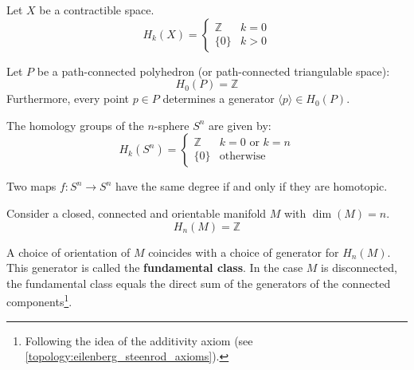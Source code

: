 	\begin{example}
		Let $X$ be a contractible space.
		\begin{equation}
			H_k(X) = \begin{cases}
				\mathbb{Z}&k=0\\
				\{0\}&k>0
			\end{cases}
		\end{equation}
	\end{example}
	\begin{example}
		Let $P$ be a path-connected polyhedron (or path-connected triangulable space):
		\begin{equation}
			H_0(P) = \mathbb{Z}
		\end{equation}
		Furthermore, every point $p\in P$ determines a generator $\langle p \rangle\in H_0(P)$.
	\end{example}
	\begin{example}
		The homology groups of the $n$-sphere $S^n$ are given by:
		\begin{equation}
			H_k(S^n)=\begin{cases}
				\mathbb{Z}&k=0\text{ or }k=n\\
				\{0\}&\text{otherwise}
			\end{cases}
		\end{equation}
	\end{example}
	\begin{property}
		Two maps $f:S^n\rightarrow S^n$ have the same degree if and only if they are homotopic.
	\end{property}
	
	\begin{example}
		Consider a closed, connected and orientable manifold $M$ with $\dim(M) = n$.
		\begin{equation}
			H_n(M) = \mathbb{Z}
		\end{equation}
	\end{example}
	\begin{result}[Orientation]
		A choice of orientation of $M$ coincides with a choice of generator for $H_n(M)$. This generator is called the \textbf{fundamental class}. In the case $M$ is disconnected, the fundamental class equals the direct sum of the generators of the connected components\footnote{Following the idea of the additivity axiom (see \ref{topology:eilenberg_steenrod_axioms}).}.
	\end{result}

